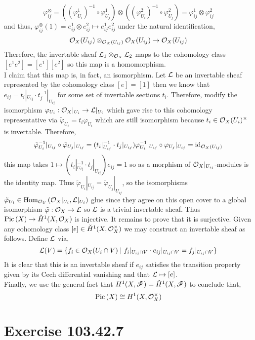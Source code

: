 \documentclass[12pt]{article}
\begin{document}
\[ \varphi_{ij}^\otimes = ((\varphi^1_{U_i})^{-1} \circ \varphi^1_{U_j}) \otimes ((\varphi^2_{U_i})^{-1} \circ \varphi^2_{U_j}) = \varphi_{ij}^1 \otimes \varphi_{ij}^2 \]
and thus, $\varphi_{ij}^\otimes(1) = e_{ij}^1 \otimes e^2_{ij} \mapsto e_{ij}^1 e_{ij}^2$ under the natural identification,
\[ \mathcal{O}_{X}(U_{ij}) \otimes_{\mathcal{O}_{X}(U_{ij})} \mathcal{O}_{X}(U_{ij}) \to \mathcal{O}_{X}(U_{ij}) \]
Therefore, the invertable sheaf $\mathcal{L}_1 \otimes_{\mathcal{O}_{X}} \mathcal{L}_2$ maps to the cohomology class $[e^1 e^2] = [e^1] [e^2]$ so this map is a homomorphism. 
\bigskip\\
I claim that this map is, in fact, an isomorphism. Let $\mathcal{L}$ be an invertable sheaf represented by the cohomology class $[e] = [1]$ then we know that $e_{ij} = t_i |_{U_{ij}} \cdot t_j^{-1} |_{U_{ij}}$ for some set of invertable sections $t_i$. Therefore, modify the isomorphism $\varphi_{U_i} : \mathcal{O}_{X}|_{U_i} \to \mathcal{L} |_{U_i}$ which gave rise to this cohomology representative via $\tilde{\varphi}_{U_i} = t_i \varphi_{U_i}$ which are still isomorphism because $t_i \in \mathcal{O}_{X}(U_i)^\times$ is invertable. Therefore, 
\[ \tilde{\varphi}_{U_i}^{-1}|_{U_{ij}} \circ \tilde{\varphi}_{U_j}|_{U_{ij}} = (t_i |_{U_{ij}}^{-1} \cdot t_j |_{U_{ij}}) \varphi_{U_i}^{-1}|_{U_{ij}} \circ \varphi_{U_j}|_{U_{ij}} = \mathrm{id}_{\mathcal{O}_{X}(U_{ij})} \]
this map takes $1 \mapsto (t_i |_{U_{ij}}^{-1} \cdot t_j |_{U_{ij}}) e_{ij} = 1$ so as a morphism of $\mathcal{O}_{X}|_{U_{ij}}$-modules is the identity map. Thus $\tilde{\varphi}_{U_i} |_{U_{ij}} = \tilde{\varphi}_{U_j} |_{U_{ij}}$, so the isomorphisms $\tilde{\varphi}_{U_i} \in \mathrm{Hom}_{\mathcal{O}_{U}} \left( \mathcal{O}_{X}|_{U_i}, \mathcal{L}|_{U_i} \right)$ glue since they agree on this open cover to a global isomorphism $\tilde{\varphi} : \mathcal{O}_{X} \to \mathcal{L}$ so $\mathcal{L}$ is a trivial invertable sheaf. Thus $\mathrm{Pic} \left( X \right) \to \check{H}^1(X, \mathcal{O}_{X})$ is injective. It remains to prove that it is surjective. Given any cohomology class $[e] \in \check{H}^1(X, \mathcal{O}_{X}^\times)$ we may construct an invertable sheaf as follows. Define $\mathcal{L}$ via,
\[ \mathcal{L}(V) = \{ f_i \in \mathcal{O}_{X}(U_i \cap V) \mid f_i |_{U_{ij} \cap V} \cdot e_{ij} |_{U_{ij} \cap V} = f_j |_{U_{ij} \cap V} \} \]
It is clear that this is an invertable sheaf if $e_{ij}$ satisfies the transition property given by its Cech differential vanishing and that $\mathcal{L} \mapsto [e]$. 
\bigskip\\
Finally, we use the general fact that $H^1(X, \mathscr{F}) = \check{H}^1(X, \mathscr{F})$ to conclude that,
\[ \mathrm{Pic} \left( X \right) \cong H^1(X, \mathcal{O}_{X}^\times) \]

\section{Exercise 103.42.7}
\end{document}
